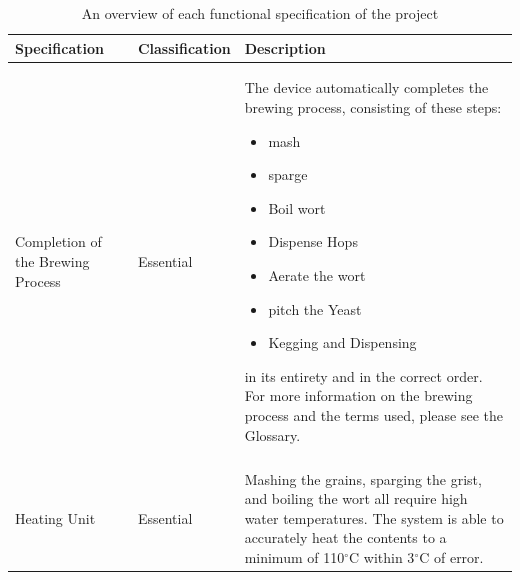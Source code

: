 \documentclass{article}
\begin{document}
\begin{table}[H]
\caption{An overview of each functional specification of the project}
\centering
\begin{tabularx}{\textwidth}{l l Z}
\toprule
\textbf{Specification} & \textbf{Classification} & \textbf{Description} \\ 
\midrule
Completion of the Brewing Process
& Essential	
& The device automatically completes the brewing process, consisting of these steps:
\begin{itemize}
\item \Gls{mash}
\item \Gls{sparge}
\item Boil \Gls{wort}
\item Dispense Hops
\item Aerate the \Gls{wort}
\item \Gls{pitch} the Yeast
\item Kegging and Dispensing
\end{itemize}
\noindent in its entirety and in the correct order.  For more information on the brewing process and the terms used, please see the Glossary.
\\\\
Heating Unit
& Essential
& Mashing the grains, sparging the \gls{grist}, and boiling the \gls{wort} all require high water temperatures. The system is able to accurately heat the contents to a minimum of 110$^{\circ}$C within 3$^{\circ}$C of error.
\\
\end{tabularx}
\end{table}
\end{document}
